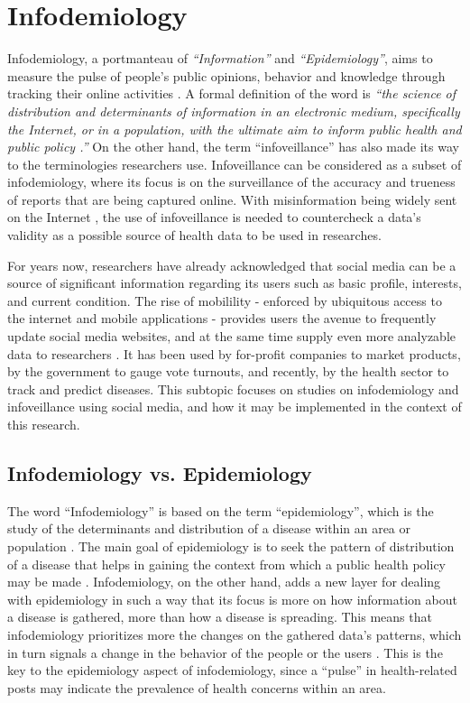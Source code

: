 \section{Infodemiology}

Infodemiology, a portmanteau of \textit{``Information''} and \textit{``Epidemiology''}, aims to measure the pulse of people's public opinions, behavior and knowledge through tracking their online activities \cite{Eysenbach:2011aa}. A formal definition of the word is \textit{``the science of distribution and determinants of information in an electronic medium, specifically the Internet, or in a population, with the ultimate aim to inform public health and public policy \cite{Eysenbach:2009aa}.''} On the other hand, the term ``infoveillance'' has also made its way to the terminologies researchers use. Infoveillance can be considered as a subset of infodemiology, where its focus is on the surveillance of the accuracy and trueness of reports that are being captured online. With misinformation being widely sent on the Internet \cite{Eysenbach:2002aa}, the use of infoveillance is needed to countercheck a data's validity as a possible source of health data to be used in researches.

For years now, researchers have already acknowledged that social media can be a source of significant information regarding its users such as basic profile, interests, and current condition. The rise of mobilility - enforced by ubiquitous access to the internet and mobile applications - provides users the avenue to frequently update social media websites, and at the same time supply even more analyzable data to researchers \cite{zeng2010social}. It has been used by for-profit companies to market products, by the government to gauge vote turnouts, and recently, by the health sector to track and predict diseases. This subtopic focuses on studies on infodemiology and infoveillance using social media, and how it may be implemented in the context of this research.

\subsection{Infodemiology vs. Epidemiology}

The word ``Infodemiology'' is based on the term ``epidemiology'', which is the study of the determinants and distribution of a disease within an area or population \cite{Eysenbach:2009aa}. The main goal of epidemiology is to seek the pattern of distribution of a disease that helps in gaining the context from which a public health policy may be made \cite{Eysenbach:2009aa}. Infodemiology, on the other hand, adds a new layer for dealing with epidemiology in such a way that its focus is more on how information about a disease is gathered, more than how a disease is spreading. This means that infodemiology prioritizes more the changes on the gathered data's patterns, which in turn signals a change in the behavior of the people or the users \cite{Eysenbach:2009aa}. This is the key to the epidemiology aspect of infodemiology, since a ``pulse'' in health-related posts may indicate the prevalence of health concerns within an area.

